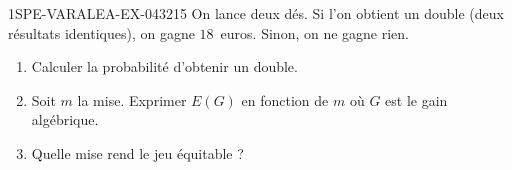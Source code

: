 \begin{exercice}{1SPE-VARALEA-EX-043}{2}{15}
On lance deux dés. Si l'on obtient un double (deux résultats identiques), on gagne $18$~euros. Sinon, on ne gagne rien.

\begin{enumerate}
  \item Calculer la probabilité d'obtenir un double.
  \item Soit $m$ la mise. Exprimer $E(G)$ en fonction de $m$ où $G$ est le gain algébrique.
  \item Quelle mise rend le jeu équitable ?
\end{enumerate}
\end{exercice}
